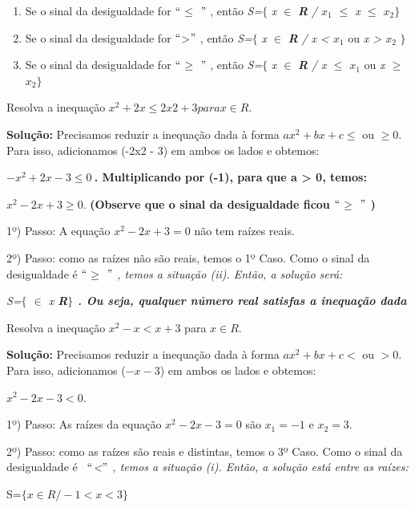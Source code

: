 \begin{caixa}
\begin{enumerate}
	\item Se o sinal da desigualdade for $``$\textit{$ \leq $ }$"$ , então \textit{S=}$ \{ $ \textit{x $\in$} \textbf{\textit{R }}\textit{/ $x_{1}$ $ \leq $  x $ \leq $  \textbf{ }$x_{2}$}$ \} $ 

	\item Se o sinal da desigualdade for $``$>$"$ , então \textit{S=}$ \{ $ \textit{x $\in$ } \textbf{\textit{R }}\textit{/ x < $x_{1}$} ou \textit{x >\textbf{ }$x_{2}$} $ \} $ 

	\item  Se o sinal da desigualdade for $``$\textit{$ \geq $ }$"$ , então \textit{S=}$ \{ $ \textit{x $\in$ } \textbf{\textit{R }}\textit{/ x $ \leq $ $x_{1}$} ou\textit{ x $ \geq $ $x_{2}$}$ \} $ 
\end{enumerate}

\end{caixa}

\begin{texemplo}
Resolva a inequação $x^{2} +2 x \leq 2x2+3 para x \in R$.

\textbf{Solução:} Precisamos reduzir a inequação dada à forma $ax^{2} + bx + c \leq$ ou $\geq 0$. Para isso, adicionamos (-2x2 - 3) em ambos os lados e obtemos:

\textbf{$-x^{2} + 2x - 3 \leq 0~$. Multiplicando por (-1), para que a > 0, temos:}

$x^{2} - 2x + 3 \geq 0$. \textbf{(Observe que o sinal da desigualdade ficou $``$$ \geq $ $"$ )}

1º) Passo: A equação  $x^{2} - 2x + 3 = 0$ não tem raízes reais.

2º) Passo: como as raízes não são reais, temos o 1º Caso. Como o sinal da desigualdade é  $``$\textit{$ \geq $ $"$ , temos a situação (ii). Então, a solução será:}

\textit{S=$ \{ $ $\in$ x  \textbf{R$ \} $ . Ou seja, qualquer número real satisfas a inequação dada \qedsymbol{}}}
\end{texemplo}

\begin{texemplo}
    Resolva a inequação $x^{2} - x < x+3$ para $x \in R$.

\textbf{Solução:} Precisamos reduzir a inequação dada à forma $ax^{2} + bx + c <$ ou $> 0$. Para isso, adicionamos ($-x-3$) em ambos os lados e obtemos:

\textit{$x^{2} - 2x - 3 < 0$}.

1º) Passo: As raízes da equação  $x^{2} - 2x - 3 = 0$ são $x_{1} = -1$ e  $x_{2} = 3.$

2º) Passo: como as raízes são reais e distintas, temos o 3º Caso. Como o sinal da desigualdade é~ $``$\textit{<$"$ , temos a situação (i). Então, a solução está entre as raízes:}

S=$ \{ x \in R / -1 < x < 3 \} $ \qedsymbol{}
\end{texemplo}


